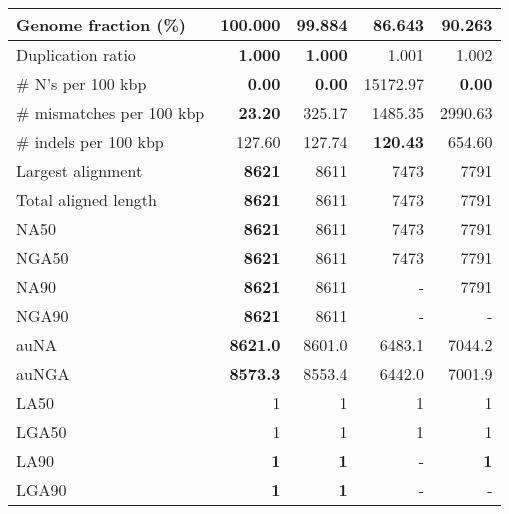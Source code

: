 \documentclass[12pt,a4paper]{article}
\begin{document}
\begin{table}[ht]
\begin{center}
\begin{tabular}{|l*{4}{|r}|}
Genome fraction (\%) & {\bf 100.000} & 99.884 & 86.643 & 90.263 \\ \hline
Duplication ratio & {\bf 1.000} & {\bf 1.000} & 1.001 & 1.002 \\ \hline
\# N's per 100 kbp & {\bf 0.00} & {\bf 0.00} & 15172.97 & {\bf 0.00} \\ \hline
\# mismatches per 100 kbp & {\bf 23.20} & 325.17 & 1485.35 & 2990.63 \\ \hline
\# indels per 100 kbp & 127.60 & 127.74 & {\bf 120.43} & 654.60 \\ \hline
Largest alignment & {\bf 8621} & 8611 & 7473 & 7791 \\ \hline
Total aligned length & {\bf 8621} & 8611 & 7473 & 7791 \\ \hline
NA50 & {\bf 8621} & 8611 & 7473 & 7791 \\ \hline
NGA50 & {\bf 8621} & 8611 & 7473 & 7791 \\ \hline
NA90 & {\bf 8621} & 8611 & - & 7791 \\ \hline
NGA90 & {\bf 8621} & 8611 & - & - \\ \hline
auNA & {\bf 8621.0} & 8601.0 & 6483.1 & 7044.2 \\ \hline
auNGA & {\bf 8573.3} & 8553.4 & 6442.0 & 7001.9 \\ \hline
LA50 & 1 & 1 & 1 & 1 \\ \hline
LGA50 & 1 & 1 & 1 & 1 \\ \hline
LA90 & {\bf 1} & {\bf 1} & - & {\bf 1} \\ \hline
LGA90 & {\bf 1} & {\bf 1} & - & - \\ \hline
\end{tabular}
\end{center}
\end{table}
\end{document}
